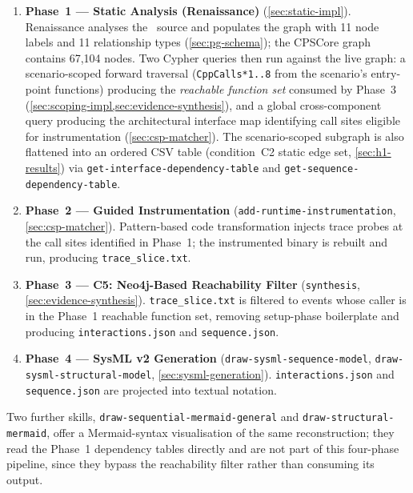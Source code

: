 \begin{enumerate}
  \item \textbf{Phase~1 --- Static Analysis (Renaissance)}
    (\cref{sec:static-impl}). Renaissance analyses the \Cpp\ source and
    populates the \neo graph with 11 node labels and 11 relationship
    types (\cref{sec:pg-schema}); the CPSCore graph contains 67,104
    nodes. Two Cypher queries then run against the live graph: a
    scenario-scoped forward traversal (\texttt{CppCalls*1..8} from the
    scenario's entry-point functions) producing the
    \emph{reachable function set} consumed by Phase~3
    (\cref{sec:scoping-impl,sec:evidence-synthesis}), and a global
    cross-component query producing the architectural interface map
    identifying call sites eligible for instrumentation
    (\cref{sec:csp-matcher}). The scenario-scoped subgraph is also
    flattened into an ordered CSV table (condition~C2 static edge set,
    \cref{sec:h1-results}) via \texttt{get-interface-dependency-table}
    and \texttt{get-sequence-dependency-table}.

  \item \textbf{Phase~2 --- Guided Instrumentation}
    (\texttt{add-runtime-instrumentation}, \cref{sec:csp-matcher}).
    Pattern-based code transformation injects trace probes at the call
    sites identified in Phase~1; the instrumented binary is rebuilt and
    run, producing \texttt{trace\_slice.txt}.

  \item \textbf{Phase~3 --- C5: Neo4j-Based Reachability Filter}
    (\texttt{synthesis}, \cref{sec:evidence-synthesis}).
    \texttt{trace\_slice.txt} is filtered to events whose caller is in
    the Phase~1 reachable function set, removing setup-phase boilerplate
    and producing \texttt{interactions.json} and \texttt{sequence.json}.

  \item \textbf{Phase~4 --- SysML v2 Generation}
    (\texttt{draw-sysml-sequence-model},
    \texttt{draw-sysml-structural-model}, \cref{sec:sysml-generation}).
    \texttt{interactions.json} and \texttt{sequence.json} are projected
    into \sysml textual notation.
\end{enumerate}

Two further skills, \texttt{draw-sequential-mermaid-general} and
\texttt{draw-structural-mermaid}, offer a Mermaid-syntax visualisation of
the same reconstruction; they read the Phase~1 dependency tables directly
and are not part of this four-phase pipeline, since they bypass the
reachability filter rather than consuming its output.

